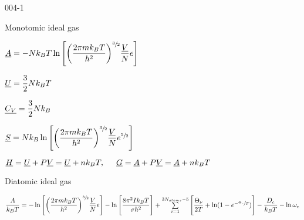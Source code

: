 \begin{mitframe}{004-1} %

    
\begin{listone}
        
    \item Monotomic ideal gas 
    
    \item $\uline{\helmholtz} = -\nummoles\boltz\Temp\ln\Bigg[\bigg(\dfrac{2\pie\mass\boltz\Temp}{\planck^{2}}\bigg)^{\sfrac{3}{2}}\dfrac{\uline{\vol}}{\nummoles}e\Bigg]$
    
    
    \item $\uline{\intenergy}=\dfrac{3}{2}\nummoles\boltz\Temp$
    
    \item $\uline{\cv}=\dfrac{3}{2}\nummoles\boltz$
    
    
    \item $\uline{\entropy}=\nummoles\boltz\ln\Bigg[\bigg(\dfrac{2\pie\mass\boltz\Temp}{\planck^{2}}\bigg)^{\sfrac{3}{2}}\dfrac{\uline{\vol}}{\nummoles}e^{\sfrac{5}{2}}\Bigg]$
    
    
    \item $\uline{\enthalpy}=\uline{\intenergy}+\p\uline{\vol}=\uline{\intenergy}+n\boltz\Temp,\tab \uline{\gibbs}=\uline{\helmholtz}+\p\uline{\vol}=\uline{\helmholtz}+n\boltz\Temp$
    
    
    \item Diatomic ideal gas 
   
   	\item $\dfrac{\helmholtz}{\boltz\Temp}=-\ln\Bigg[\bigg(\dfrac{2\pie\mass\boltz\Temp}{\planck^{2}}\bigg)^{\sfrac{3}{2}}\dfrac{\uline{\vol}}{\nummoles}e\Bigg]-\ln\Bigg[\dfrac{8\pie^{2}\mominertia\boltz\Temp}{\molecrad\planck^{2}}\Bigg]+\sum\limits_{i=1}^{3\nummoles_{atoms}-5}\Bigg[\dfrac{\vibrfreqfac}{2\Temp}+\ln(1-e^{-\sfrac{\vibrfreqfac}{\Temp}})\Bigg]-\dfrac{\eneatom}{\boltz\Temp}-\ln\elecdegen$
    

\end{listone}
\end{mitframe}
